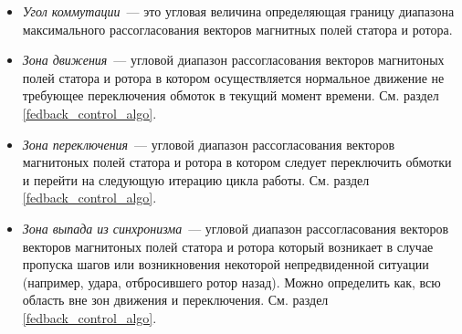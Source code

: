 \begin{itemize}
    \item \textit{Угол коммутации}~--- это угловая величина определяющая границу
        диапазона максимального рассогласования векторов магнитных полей статора
        и ротора.

    \item \textit{Зона движения}~--- угловой диапазон рассогласования векторов
        магнитоных полей статора и ротора в котором осуществляется нормальное
        движение не требующее переключения обмоток в текущий момент времени.
        См. раздел \ref{fedback_control_algo}.

    \item \textit{Зона переключения}~--- угловой диапазон рассогласования
        векторов магнитоных полей статора и ротора в котором следует переключить
        обмотки и перейти на следующую итерацию цикла работы.
        См. раздел \ref{fedback_control_algo}.

    \item \textit{Зона выпада из синхронизма}~--- угловой диапазон
        рассогласования векторов векторов магнитоных полей статора и ротора
        который возникает в случае пропуска шагов или возникновения некоторой
        непредвиденной ситуации (например, удара, отбросившего ротор назад).
        Можно определить как, всю область вне зон движения и переключения.
        См. раздел \ref{fedback_control_algo}.

\end{itemize}
